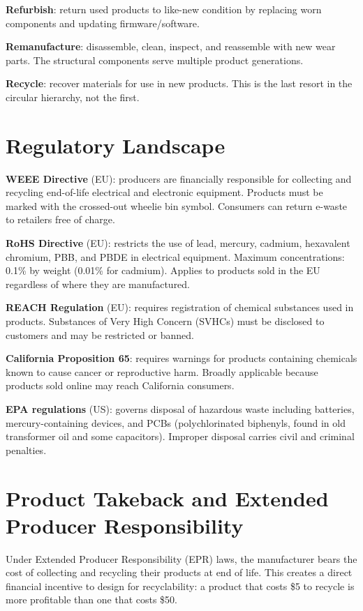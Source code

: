 \documentclass[11pt,letterpaper,twoside,openany]{book}
\begin{document}
\textbf{Refurbish}: return used products to like-new condition by replacing worn components and updating firmware/software.

\textbf{Remanufacture}: disassemble, clean, inspect, and reassemble with new wear parts. The structural components serve multiple product generations.

\textbf{Recycle}: recover materials for use in new products. This is the last resort in the circular hierarchy, not the first.

\section{Regulatory Landscape}
\textbf{WEEE Directive} (EU): producers are financially responsible for collecting and recycling end-of-life electrical and electronic equipment. Products must be marked with the crossed-out wheelie bin symbol. Consumers can return e-waste to retailers free of charge.

\textbf{RoHS Directive} (EU): restricts the use of lead, mercury, cadmium, hexavalent chromium, PBB, and PBDE in electrical equipment. Maximum concentrations: 0.1\% by weight (0.01\% for cadmium). Applies to products sold in the EU regardless of where they are manufactured.

\textbf{REACH Regulation} (EU): requires registration of chemical substances used in products. Substances of Very High Concern (SVHCs) must be disclosed to customers and may be restricted or banned.

\textbf{California Proposition 65}: requires warnings for products containing chemicals known to cause cancer or reproductive harm. Broadly applicable because products sold online may reach California consumers.

\textbf{EPA regulations} (US): governs disposal of hazardous waste including batteries, mercury-containing devices, and PCBs (polychlorinated biphenyls, found in old transformer oil and some capacitors). Improper disposal carries civil and criminal penalties.

\section{Product Takeback and Extended Producer Responsibility}
Under Extended Producer Responsibility (EPR) laws, the manufacturer bears the cost of collecting and recycling their products at end of life. This creates a direct financial incentive to design for recyclability: a product that costs \$5 to recycle is more profitable than one that costs \$50.
\end{document}
